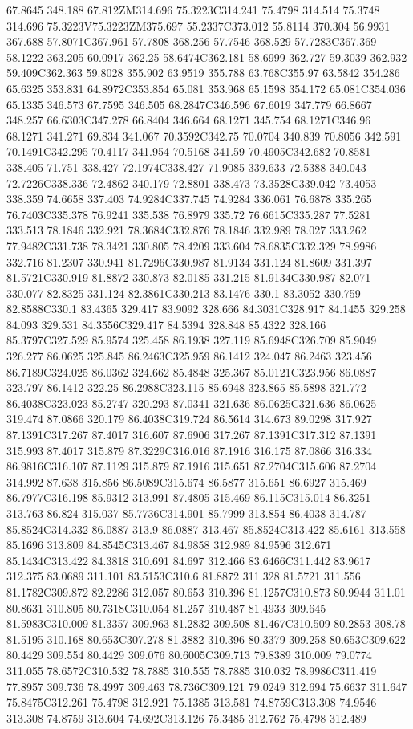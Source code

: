 67.8645 348.188 67.812ZM314.696 75.3223C314.241 75.4798 314.514 75.3748 314.696 75.3223V75.3223ZM375.697 55.2337C373.012 55.8114 370.304 56.9931 367.688 57.8071C367.961 57.7808 368.256 57.7546 368.529 57.7283C367.369 58.1222 363.205 60.0917 362.25 58.6474C362.181 58.6999 362.727 59.3039 362.932 59.409C362.363 59.8028 355.902 63.9519 355.788 63.768C355.97 63.5842 354.286 65.6325 353.831 64.8972C353.854 65.081 353.968 65.1598 354.172 65.081C354.036 65.1335 346.573 67.7595 346.505 68.2847C346.596 67.6019 347.779 66.8667 348.257 66.6303C347.278 66.8404 346.664 68.1271 345.754 68.1271C346.96 68.1271 341.271 69.834 341.067 70.3592C342.75 70.0704 340.839 70.8056 342.591 70.1491C342.295 70.4117 341.954 70.5168 341.59 70.4905C342.682 70.8581 338.405 71.751 338.427 72.1974C338.427 71.9085 339.633 72.5388 340.043 72.7226C338.336 72.4862 340.179 72.8801 338.473 73.3528C339.042 73.4053 338.359 74.6658 337.403 74.9284C337.745 74.9284 336.061 76.6878 335.265 76.7403C335.378 76.9241 335.538 76.8979 335.72 76.6615C335.287 77.5281 333.513 78.1846 332.921 78.3684C332.876 78.1846 332.989 78.027 333.262 77.9482C331.738 78.3421 330.805 78.4209 333.604 78.6835C332.329 78.9986 332.716 81.2307 330.941 81.7296C330.987 81.9134 331.124 81.8609 331.397 81.5721C330.919 81.8872 330.873 82.0185 331.215 81.9134C330.987 82.071 330.077 82.8325 331.124 82.3861C330.213 83.1476 330.1 83.3052 330.759 82.8588C330.1 83.4365 329.417 83.9092 328.666 84.3031C328.917 84.1455 329.258 84.093 329.531 84.3556C329.417 84.5394 328.848 85.4322 328.166 85.3797C327.529 85.9574 325.458 86.1938 327.119 85.6948C326.709 85.9049 326.277 86.0625 325.845 86.2463C325.959 86.1412 324.047 86.2463 323.456 86.7189C324.025 86.0362 324.662 85.4848 325.367 85.0121C323.956 86.0887 323.797 86.1412 322.25 86.2988C323.115 85.6948 323.865 85.5898 321.772 86.4038C323.023 85.2747 320.293 87.0341 321.636 86.0625C321.636 86.0625 319.474 87.0866 320.179 86.4038C319.724 86.5614 314.673 89.0298 317.927 87.1391C317.267 87.4017 316.607 87.6906 317.267 87.1391C317.312 87.1391 315.993 87.4017 315.879 87.3229C316.016 87.1916 316.175 87.0866 316.334 86.9816C316.107 87.1129 315.879 87.1916 315.651 87.2704C315.606 87.2704 314.992 87.638 315.856 86.5089C315.674 86.5877 315.651 86.6927 315.469 86.7977C316.198 85.9312 313.991 87.4805 315.469 86.115C315.014 86.3251 313.763 86.824 315.037 85.7736C314.901 85.7999 313.854 86.4038 314.787 85.8524C314.332 86.0887 313.9 86.0887 313.467 85.8524C313.422 85.6161 313.558 85.1696 313.809 84.8545C313.467 84.9858 312.989 84.9596 312.671 85.1434C313.422 84.3818 310.691 84.697 312.466 83.6466C311.442 83.9617 312.375 83.0689 311.101 83.5153C310.6 81.8872 311.328 81.5721 311.556 81.1782C309.872 82.2286 312.057 80.653 310.396 81.1257C310.873 80.9944 311.01 80.8631 310.805 80.7318C310.054 81.257 310.487 81.4933 309.645 81.5983C310.009 81.3357 309.963 81.2832 309.508 81.467C310.509 80.2853 308.78 81.5195 310.168 80.653C307.278 81.3882 310.396 80.3379 309.258 80.653C309.622 80.4429 309.554 80.4429 309.076 80.6005C309.713 79.8389 310.009 79.0774 311.055 78.6572C310.532 78.7885 310.555 78.7885 310.032 78.9986C311.419 77.8957 309.736 78.4997 309.463 78.736C309.121 79.0249 312.694 75.6637 311.647 75.8475C312.261 75.4798 312.921 75.1385 313.581 74.8759C313.308 74.9546 313.308 74.8759 313.604 74.692C313.126 75.3485 312.762 75.4798 312.489 